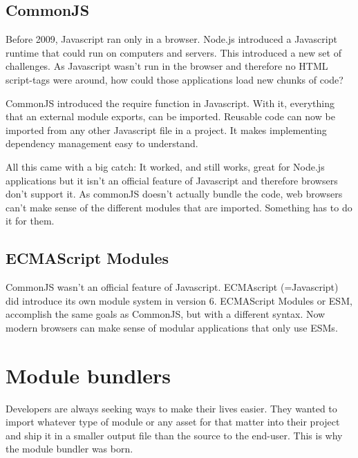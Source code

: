 

\subsection{CommonJS}

Before 2009, Javascript ran only in a browser. Node.js introduced a Javascript runtime that could run on computers and servers. This introduced a new set of challenges. As Javascript wasn’t run in the browser and therefore no HTML script-tags were around, how could those applications load new chunks of code? 

CommonJS introduced the require function in Javascript. With it, everything that an external module exports, can be imported. Reusable code can now be imported from any other Javascript file in a project. It makes implementing dependency management easy to understand.

All this came with a big catch: It worked, and still works, great for Node.js applications but it isn’t an official feature of Javascript and therefore browsers don’t support it. As commonJS doesn’t actually bundle the code, web browsers can’t make sense of the different modules that are imported. Something has to do it for them. 





\subsection{ECMAScript Modules}

CommonJS wasn’t an official feature of Javascript. ECMAscript (=Javascript) did introduce its own module system in version 6. ECMAScript Modules or ESM, accomplish the same goals as CommonJS, but with a different syntax. Now modern browsers can make sense of modular applications that only use ESMs. 





\section{Module bundlers}

Developers are always seeking ways to make their lives easier. They wanted to import whatever type of module or any asset for that matter into their project and ship it in a smaller output file than the source to the end-user. This is why the module bundler was born. 

